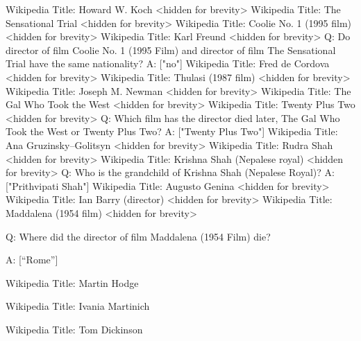 \documentclass[
]{article}
\newenvironment{Shaded}{}{}
\newcommand{\NormalTok}[1]{#1}
\begin{document}
\begin{Shaded}
\begin{Highlighting}[]
\NormalTok{Wikipedia Title: Howard W. Koch}
\NormalTok{\textless{}hidden for brevity\textgreater{}}
\NormalTok{Wikipedia Title: The Sensational Trial}
\NormalTok{\textless{}hidden for brevity\textgreater{}}
\NormalTok{Wikipedia Title: Coolie No. 1 (1995 film)}
\NormalTok{\textless{}hidden for brevity\textgreater{}}
\NormalTok{Wikipedia Title: Karl Freund}
\NormalTok{\textless{}hidden for brevity\textgreater{}}
\NormalTok{Q: Do director of film Coolie No. 1 (1995 Film) and director of film The Sensational Trial have the same nationality?}
\NormalTok{A: ["no"]}
\NormalTok{Wikipedia Title: Fred de Cordova}
\NormalTok{\textless{}hidden for brevity\textgreater{}}
\NormalTok{Wikipedia Title: Thulasi (1987 film)}
\NormalTok{\textless{}hidden for brevity\textgreater{}}
\NormalTok{Wikipedia Title: Joseph M. Newman}
\NormalTok{\textless{}hidden for brevity\textgreater{}}
\NormalTok{Wikipedia Title: The Gal Who Took the West}
\NormalTok{\textless{}hidden for brevity\textgreater{}}
\NormalTok{Wikipedia Title: Twenty Plus Two}
\NormalTok{\textless{}hidden for brevity\textgreater{}}
\NormalTok{Q: Which film has the director died later, The Gal Who Took the West or Twenty Plus Two?}
\NormalTok{A: ["Twenty Plus Two"]}
\NormalTok{Wikipedia Title: Ana Gruzinsky–Golitsyn}
\NormalTok{\textless{}hidden for brevity\textgreater{}}
\NormalTok{Wikipedia Title: Rudra Shah}
\NormalTok{\textless{}hidden for brevity\textgreater{}}
\NormalTok{Wikipedia Title: Krishna Shah (Nepalese royal)}
\NormalTok{\textless{}hidden for brevity\textgreater{}}
\NormalTok{Q: Who is the grandchild of Krishna Shah (Nepalese Royal)?}
\NormalTok{A: ["Prithvipati Shah"]}
\NormalTok{Wikipedia Title: Augusto Genina}
\NormalTok{\textless{}hidden for brevity\textgreater{}}
\NormalTok{Wikipedia Title: Ian Barry (director)}
\NormalTok{\textless{}hidden for brevity\textgreater{}}
\NormalTok{Wikipedia Title: Maddalena (1954 film)}
\NormalTok{\textless{}hidden for brevity\textgreater{} }
\end{Highlighting}
\end{Shaded}

Q: Where did the director of film Maddalena (1954 Film) die?

A: {[}``Rome''{]}

Wikipedia Title: Martin Hodge

Wikipedia Title: Ivania Martinich

Wikipedia Title: Tom Dickinson
\end{document}
